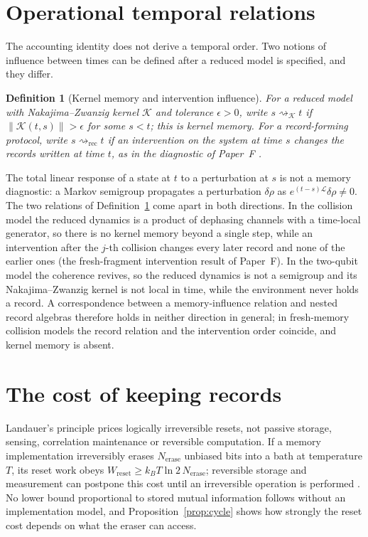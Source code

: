 \documentclass[12pt]{article}
\newtheorem{definition}[theorem]{Definition}
\begin{document}
\section{Operational temporal relations}
\label{sec:arrow}

The accounting identity does not derive a temporal order. Two notions of influence between times can be defined after a reduced model is specified, and they differ.

\begin{definition}[Kernel memory and intervention influence]
\label{def:memory_order}
For a reduced model with Nakajima--Zwanzig kernel $\mathcal K$ and tolerance $\epsilon>0$, write $s\rightsquigarrow_{\mathcal K}t$ if $\|\mathcal K(t,s)\|>\epsilon$ for some $s<t$; this is kernel memory. For a record-forming protocol, write $s\rightsquigarrow_{\mathrm{rec}}t$ if an intervention on the system at time $s$ changes the records written at time $t$, as in the diagnostic of Paper~F \cite{Liu2026HAFF_F}.
\end{definition}

The total linear response of a state at $t$ to a perturbation at $s$ is not a memory diagnostic: a Markov semigroup propagates a perturbation $\delta\rho$ as $e^{(t-s)\mathcal L}\delta\rho\neq0$. The two relations of Definition~\ref{def:memory_order} come apart in both directions. In the collision model the reduced dynamics is a product of dephasing channels with a time-local generator, so there is no kernel memory beyond a single step, while an intervention after the $j$-th collision changes every later record and none of the earlier ones (the fresh-fragment intervention result of Paper~F). In the two-qubit model the coherence revives, so the reduced dynamics is not a semigroup and its Nakajima--Zwanzig kernel is not local in time, while the environment never holds a record. A correspondence between a memory-influence relation and nested record algebras therefore holds in neither direction in general; in fresh-memory collision models the record relation and the intervention order coincide, and kernel memory is absent.

\section{The cost of keeping records}
\label{sec:cost}

Landauer's principle prices logically irreversible resets, not passive storage, sensing, correlation maintenance or reversible computation. If a memory implementation irreversibly erases $N_{\mathrm{erase}}$ unbiased bits into a bath at temperature $T$, its reset work obeys $W_{\mathrm{reset}}\ge k_BT\ln2\,N_{\mathrm{erase}}$; reversible storage and measurement can postpone this cost until an irreversible operation is performed \cite{Landauer1961,Bennett1982}. No lower bound proportional to stored mutual information follows without an implementation model, and Proposition~\ref{prop:cycle} shows how strongly the reset cost depends on what the eraser can access.
\end{document}
